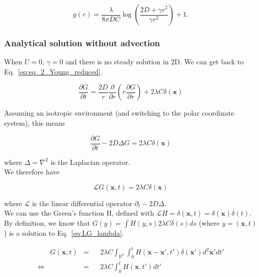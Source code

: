 {\color{blue}
\begin{equation}
g(r)=\frac{\lambda}{8\pi DC}\log\left(\frac{2D+\gamma r^{2}}{\gamma r^{2}}\right)+1.
\end{equation}
}

\subsubsection*{Analytical solution without advection}

When $U=0$, $\gamma=0$ and there is no steady solution in 2D. We can get
back to Eq.~\ref{eq:eq_2_Young_reduced}.

\begin{equation}
\frac{\partial G}{\partial t}=\frac{2D}{r}\frac{\partial}{\partial r}\left(r\frac{\partial G}{\partial r}\right)+2\lambda C\delta(\boldsymbol{x})\label{eq:g_without_advection}
\end{equation}

Assuming an isotropic environment (and switching to the polar coordinate system), this means

\begin{equation}
\frac{\partial G}{\partial t}-2D\Delta G=2\lambda C\delta(\boldsymbol{x})
\end{equation}

where $\Delta=\nabla^{2}$ is the Laplacian operator. \\

We therefore have 

\begin{equation}
\mathcal{L}G(\boldsymbol{x},t)=2\lambda C\delta(\boldsymbol{x})\label{eq:LG_lambda}
\end{equation}

where $\mathcal{L}$ is the linear differential operator $\partial_{t}-2D\Delta$. \\

We can use the Green's function H, defined with $\mathcal{L}H=\delta(\boldsymbol{x},t)=\delta(\boldsymbol{x})\delta(t)$. \\

By definition, we know that $G(y)=\int H(y,s)2\lambda C\delta(s)ds$
(where $y=(\boldsymbol{x},t)$) is a solution to Eq.~\ref{eq:LG_lambda}.

\begin{align}
 & G(\boldsymbol{x},t) & = & & 2\lambda C\int_{\mathbb{R}^{2}}\int_{0}^{t}H(\boldsymbol{x}-\boldsymbol{x}',t')\delta(\boldsymbol{x}')d^2\boldsymbol{x}'dt'\nonumber \\
\Leftrightarrow &  & = &  & 2\lambda C\int_{0}^{t}H(\boldsymbol{x},t')dt'\label{eq:g_int_H}
\end{align}

